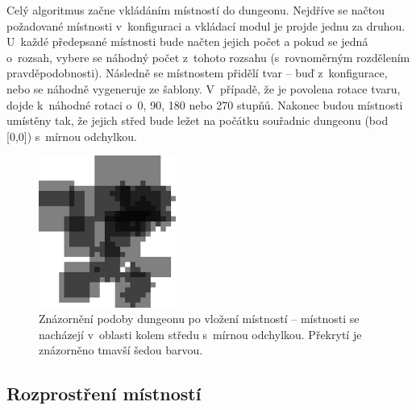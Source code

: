Celý algoritmus začne vkládáním místností do dungeonu.
Nejdříve se načtou požadované místnosti v~konfiguraci a vkládací modul je projde jednu za druhou.
U~každé předepsané místnosti bude načten jejich počet a pokud se jedná o~rozsah, vybere se náhodný počet z~tohoto rozsahu (s~rovnoměrným rozdělením pravděpodobnosti).
Následně se místnostem přidělí tvar -- buď z~konfigurace, nebo se náhodně vygeneruje ze šablony.
V~případě, že je povolena rotace tvaru, dojde k~náhodné rotaci o~0, 90, 180 nebo 270 stupňů.
Nakonec budou místnosti umístěny tak, že jejich střed bude ležet na počátku souřadnic dungeonu (bod [0,0]) s~mírnou odchylkou.
\begin{figure}[hbt]
    \centering
    \includegraphics[width=0.4\textwidth]{obrazky/navrh1.png}
    \caption{Znázornění podoby dungeonu po vložení místností -- místnosti se nacházejí v~oblasti kolem středu s~mírnou odchylkou. Překrytí je znázorněno tmavší šedou barvou.}
    \label{img:navrh1}
\end{figure}


\subsection{Rozprostření místností}



